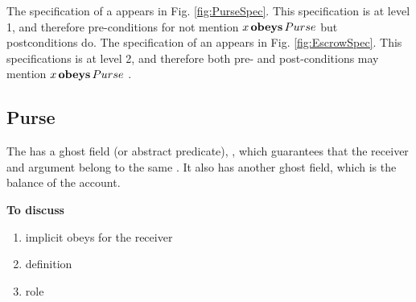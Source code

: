 
The specification of  a  appears in Fig. \ref{fig:PurseSpec}. This specification is at level 1, and therefore pre-conditions for not mention $x\, \textbf{obeys} \, Purse$ but postconditions do.
The specification of  an   appears in Fig. \ref{fig:EscrowSpec}. This specifications is at level 2, and therefore both pre- and post-conditions may mention  $x\, \textbf{obeys} \, Purse$ .

\newcommand{\sMT}{sellerM} 
\newcommand{\bMT}{buyerM}
\newcommand{\sGT}{sellerG} 
\newcommand{\bGT}{buyerG}
\newcommand{\sM}{\prg{\sMT}}
\newcommand{\bM}{\prg{\bMT}}
\newcommand{\sG}{\prg{\sGT}}
\newcommand{\bG}{\prg{\sGT}}
\newcommand{\old}{\ensuremath{_{old}}}

\subsection{Purse}

The  has a ghost field (or abstract predicate), , which guarantees that the receiver and argument belong to the same .  It also has another ghost field, which is the balance of the account.

\textbf{To discuss} \begin{enumerate}
\item
implicit obeys for the receiver
\item
{} definition
\item
{} role
\end{enumerate}

